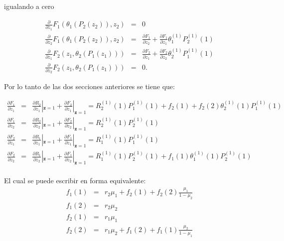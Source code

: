 \documentclass{article}
\begin{document}
igualando a cero

\begin{eqnarray*}
\frac{\partial}{\partial
z_{1}}F_{1}\left(\theta_{1}\left(P_{2}\left(z_{2}\right)\right),z_{2}\right)&=&0\\
\frac{\partial}{\partial
z_{2}}F_{1}\left(\theta_{1}\left(P_{2}\left(z_{2}\right)\right),z_{2}\right)&=&\frac{\partial
F_{1}}{\partial z_{2}}+\frac{\partial F_{1}}{\partial
z_{1}}\theta_{1}^{(1)}P_{2}^{(1)}\left(1\right)\\
\frac{\partial}{\partial
z_{1}}F_{2}\left(z_{1},\theta_{2}\left(P_{1}\left(z_{1}\right)\right)\right)&=&\frac{\partial
F_{2}}{\partial z_{1}}+\frac{\partial F_{2}}{\partial
z_{2}}\theta_{2}^{(1)}P_{1}^{(1)}\left(1\right)\\
\frac{\partial}{\partial
z_{2}}F_{2}\left(z_{1},\theta_{2}\left(P_{1}\left(z_{1}\right)\right)\right)&=&0.
\end{eqnarray*}


Por lo tanto de las dos secciones anteriores se tiene que:


\begin{eqnarray*}
\frac{\partial F_{1}}{\partial z_{1}}&=&\frac{\partial
R_{2}}{\partial z_{1}}|_{\mathbf{z}=1}+\frac{\partial F_{2}}{\partial z_{1}}|_{\mathbf{z}=1}=R_{2}^{(1)}\left(1\right)P_{1}^{(1)}\left(1\right)+f_{2}\left(1\right)+f_{2}\left(2\right)\theta_{2}^{(1)}\left(1\right)P_{1}^{(1)}\left(1\right)\\
\frac{\partial F_{1}}{\partial z_{2}}&=&\frac{\partial
R_{2}}{\partial z_{2}}|_{\mathbf{z}=1}+\frac{\partial F_{2}}{\partial z_{2}}|_{\mathbf{z}=1}=R_{2}^{(1)}\left(1\right)P_{2}^{(1)}\left(1\right)\\
\frac{\partial F_{2}}{\partial z_{1}}&=&\frac{\partial
R_{1}}{\partial z_{1}}|_{\mathbf{z}=1}+\frac{\partial F_{1}}{\partial z_{1}}|_{\mathbf{z}=1}=R_{1}^{(1)}\left(1\right)P_{1}^{(1)}\left(1\right)\\
\frac{\partial F_{2}}{\partial z_{2}}&=&\frac{\partial
R_{1}}{\partial z_{2}}|_{\mathbf{z}=1}+\frac{\partial F_{1}}{\partial z_{2}}|_{\mathbf{z}=1}
=R_{1}^{(1)}\left(1\right)P_{2}^{(1)}\left(1\right)+f_{1}\left(1\right)\theta_{1}^{(1)}\left(1\right)P_{2}^{(1)}\left(1\right)\\
\end{eqnarray*}


El cual se puede escribir en forma equivalente:
\begin{eqnarray*}
f_{1}\left(1\right)&=&r_{2}\mu_{1}+f_{2}\left(1\right)+f_{2}\left(2\right)\frac{\mu_{1}}{1-\mu_{2}}\\
f_{1}\left(2\right)&=&r_{2}\mu_{2}\\
f_{2}\left(1\right)&=&r_{1}\mu_{1}\\
f_{2}\left(2\right)&=&r_{1}\mu_{2}+f_{1}\left(2\right)+f_{1}\left(1\right)\frac{\mu_{2}}{1-\mu_{1}}\\
\end{eqnarray*}
\end{document}
